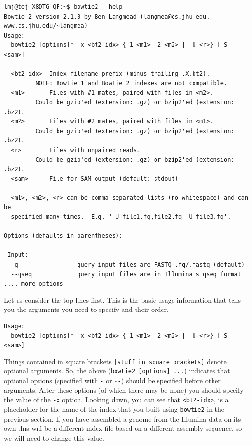 \documentclass[11pt]{article}
\begin{document}
\begin{verbatim}
lmj@tej-X8DTG-QF:~$ bowtie2 --help
Bowtie 2 version 2.1.0 by Ben Langmead (langmea@cs.jhu.edu, www.cs.jhu.edu/~langmea)
Usage: 
  bowtie2 [options]* -x <bt2-idx> {-1 <m1> -2 <m2> | -U <r>} [-S <sam>]

  <bt2-idx>  Index filename prefix (minus trailing .X.bt2).
	     NOTE: Bowtie 1 and Bowtie 2 indexes are not compatible.
  <m1>       Files with #1 mates, paired with files in <m2>.
	     Could be gzip'ed (extension: .gz) or bzip2'ed (extension: .bz2).
  <m2>       Files with #2 mates, paired with files in <m1>.
	     Could be gzip'ed (extension: .gz) or bzip2'ed (extension: .bz2).
  <r>        Files with unpaired reads.
	     Could be gzip'ed (extension: .gz) or bzip2'ed (extension: .bz2).
  <sam>      File for SAM output (default: stdout)

  <m1>, <m2>, <r> can be comma-separated lists (no whitespace) and can be
  specified many times.  E.g. '-U file1.fq,file2.fq -U file3.fq'.

Options (defaults in parentheses):

 Input:
  -q                 query input files are FASTQ .fq/.fastq (default)
  --qseq             query input files are in Illumina's qseq format
.... more options
\end{verbatim}


Let us consider the top lines first. This is the basic usage information
that tells you the arguments you need to specify and their order.

\begin{verbatim}
Usage: 
  bowtie2 [options]* -x <bt2-idx> {-1 <m1> -2 <m2> | -U <r>} [-S <sam>]
\end{verbatim}

Things contained in square brackets \texttt{[stuff in square brackets]} denote
optional arguments. So, the above (\texttt{bowtie2 [options] ...}) indicates that optional options (specified
with \texttt{-} or \texttt{-{}-}) should be specified before other arguments. After these
options (of which there may be none) you should specify the value of the \texttt{-x}
option. Looking down, you can see that \texttt{<bt2-idx>}, is a placeholder for
the name of the index that you built using \texttt{bowtie2} in the
previous section. If you have assembled a genome from the Illumina data on
its own this will be a different index file based on a different assembly
sequence, so we will need to change this value.
\end{document}
